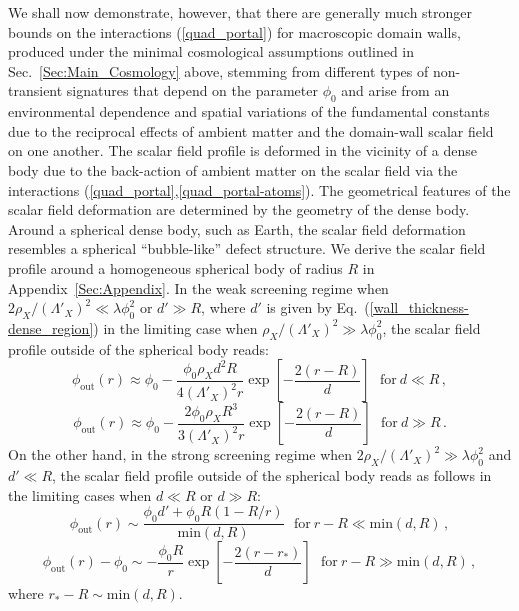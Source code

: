 \documentclass[aps,prd,onecolumn,nofootinbib]{revtex4-2} %
\begin{document}
We shall now demonstrate, however, that there are generally much stronger bounds on the interactions (\ref{quad_portal}) for macroscopic domain walls, produced under the minimal cosmological assumptions outlined in Sec.~\ref{Sec:Main_Cosmology} above, stemming from different types of non-transient signatures that depend on the parameter $\phi_0$ and arise from an environmental dependence and spatial variations of the fundamental constants due to the reciprocal effects of ambient matter and the domain-wall scalar field on one another. 
The scalar field profile is deformed in the vicinity of a dense body due to the back-action of ambient matter on the scalar field via the interactions (\ref{quad_portal},\ref{quad_portal-atoms}). 
The geometrical features of the scalar field deformation are determined by the geometry of the dense body. 
Around a spherical dense body, such as Earth, the scalar field deformation resembles a spherical ``bubble-like'' defect structure. 
We derive the scalar field profile around a homogeneous spherical body of radius $R$ in Appendix~\ref{Sec:Appendix}. 
In the weak screening regime when $2 \rho_X / (\Lambda'_X)^2 \ll \lambda \phi_0^2$ or $d' \gg R$, where $d'$ is given by Eq.~(\ref{wall_thickness-dense_region}) in the limiting case when $\rho_X / (\Lambda'_X)^2 \gg \lambda \phi_0^2$, the scalar field profile outside of the spherical body reads: 
\begin{equation}
\label{scalar_profile_weak_screening-A}
\phi_\textrm{out}(r) \approx \phi_0 - \frac{\phi_0 \rho_X d^2 R}{4 \left( \Lambda'_X \right)^2 r} \exp \left[ - \frac{2 \left( r - R \right)}{d} \right]  ~~~\textrm{for} ~ d \ll R  \, , 
\end{equation}
\begin{equation}
\label{scalar_profile_weak_screening-B}
\phi_\textrm{out}(r) \approx \phi_0 - \frac{2 \phi_0 \rho_X R^3}{3 \left( \Lambda'_X \right)^2 r} \exp \left[ - \frac{2 \left( r - R \right)}{d} \right]  ~~~\textrm{for} ~ d \gg R  \, . 
\end{equation}
On the other hand, in the strong screening regime when $2 \rho_X / (\Lambda'_X)^2 \gg \lambda \phi_0^2$ and $d' \ll R$, the scalar field profile outside of the spherical body reads as follows in the limiting cases when $d \ll R$ or $d \gg R$: 
\begin{equation}
\label{scalar_profile_strong_screening-A}
\phi_\textrm{out}(r) \sim \frac{\phi_0 d' + \phi_0 R (1 - R/r)}{\textrm{min} \left( d , R \right)}  ~~~\textrm{for} ~ r - R \ll \textrm{min} \left( d , R \right)  \, , 
\end{equation}
\begin{equation}
\label{scalar_profile_strong_screening-Bx}
\phi_\textrm{out}(r) - \phi_0 \sim - \frac{\phi_0 R}{r} \exp \left[ - \frac{2 \left( r - r_* \right)}{d} \right] ~~~\textrm{for} ~ r - R \gg \textrm{min} \left( d , R \right)  \, , 
\end{equation}
where $r_* - R \sim \textrm{min}(d,R)$. 
\end{document}
